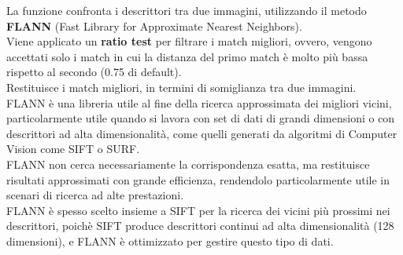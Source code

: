 \documentclass[12pt,a4paper,openright,twoside]{book}
\begin{document}
\begin{enumerate}
\begin{enumerate}
\begin{figure}[H]
    \centering
    
\end{figure}

La funzione confronta i descrittori tra due immagini, utilizzando il metodo \textbf{FLANN} (Fast Library for Approximate Nearest Neighbors).\\
Viene applicato un \textbf{ratio test} per filtrare i match migliori, ovvero, vengono accettati solo i match in cui la distanza del primo match è molto più bassa rispetto al secondo (0.75 di default).\\
Restituisce i match migliori, in termini di somiglianza tra due immagini.\\
FLANN è una libreria utile al fine della ricerca approssimata dei migliori vicini, particolarmente utile quando si lavora con set di dati di grandi dimensioni o con descrittori ad alta dimensionalità, come quelli generati da algoritmi di Computer Vision come SIFT o SURF.\\
FLANN non cerca necessariamente la corrispondenza esatta, ma restituisce risultati approssimati con grande efficienza, rendendolo particolarmente utile in scenari di ricerca ad alte prestazioni.\\
FLANN  è spesso scelto insieme a SIFT per la ricerca dei vicini più prossimi nei descrittori, poichè SIFT produce descrittori continui ad alta dimensionalità (128 dimensioni), e FLANN è ottimizzato per gestire questo tipo di dati. \\


\end{enumerate}
\end{enumerate}
\end{document}
